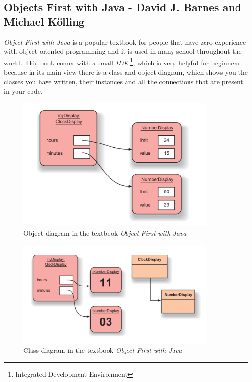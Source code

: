\documentclass[]{usiinfbachelorproject}
\begin{document}
\subsection{Objects First with Java - David J. Barnes and Michael K\"{o}lling}

\emph{Object First with Java} is a popular textbook for people that have zero experience with object oriented programming and it is used in many school throughout the world. This book comes with a small \emph{IDE} \footnote{Integrated Development Environment}, which is very helpful for beginners because in its main view there is a class and object diagram, which shows you the classes you have written, their instances and all the connections that are present in your code.\\

\begin{figure}[h!]
\centering
\includegraphics[width=10cm]{figures/object_diagram.png}
\caption {Object diagram in the textbook \emph{Object First with Java}}
\end{figure}

\begin{figure}[h!]
\centering
\includegraphics[width=10cm]{figures/class_diagram.png}
\caption {Class diagram in the textbook \emph{Object First with Java}}
\end{figure}
\end{document}
